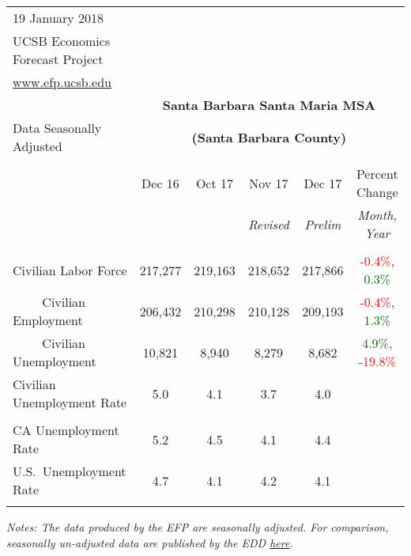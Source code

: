 \documentclass[12pt]{article}
\begin{document}
\begin{table}
\begin{tabular}{|l|c|c|c|c|c|}
\multicolumn{1}{l}{\small 19 January 2018} & \multicolumn{5}{c}{} \\
\multicolumn{1}{l}{\small UCSB Economics Forecast Project} & \multicolumn{5}{c}{} \\
\multicolumn{1}{l}{\small \href{http://www.efp.ucsb.edu/}{www.efp.ucsb.edu}} & \multicolumn{5}{c}{} \\
\multicolumn{1}{c}{} & \multicolumn{5}{c}{\large \textbf{Santa Barbara Santa Maria MSA}} \\
\multicolumn{1}{l}{\small Data Seasonally Adjusted} & \multicolumn{5}{c}{\small \textbf{(Santa Barbara County)}} \\ \hline \hline
& & & & & \\
 & Dec 16 & Oct 17 & Nov 17 & Dec 17 & Percent Change \\
 & & & \small \textit{Revised} & \small \textit{Prelim} & \small \textit{Month, Year} \\ \hline
& & & & & \\
Civilian Labor Force & 217,277 & 219,163 & 218,652 & 217,866 & \textcolor{red}{-0.4\%}, \textcolor{darkgreen}{0.3\%} \\
$\qquad$ \small Civilian Employment & 206,432 & 210,298 & 210,128 & 209,193 & \textcolor{red}{-0.4\%}, \textcolor{darkgreen}{1.3\%} \\
$\qquad$ \small Civilian Unemployment & 10,821 & 8,940 & 8,279 & 8,682 & \textcolor{darkgreen}{4.9\%}, \textcolor{red}{-19.8\%} \\
Civilian Unemployment Rate & 5.0 & 4.1 & 3.7 & 4.0 & \\
& & & & & \\
CA Unemployment Rate & 5.2 & 4.5 & 4.1 & 4.4 & \\
U.S.\ Unemployment Rate & 4.7 & 4.1 & 4.2 & 4.1 & \\
& & & & & \\ \hline \hline
\end{tabular}
\par
\vspace{.5em}
\footnotesize
\textit{Notes: The data produced by the EFP are seasonally adjusted. For comparison, seasonally un-adjusted data are published by the EDD \href{http://www.labormarketinfo.ca.gov/file/lfmonth/satb$pds.pdf}{here}.}
\end{table}
\end{document}

